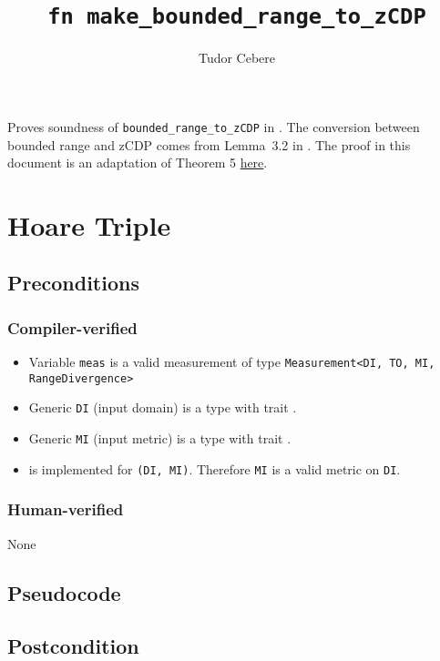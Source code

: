 \documentclass{article}
\title{\texttt{fn make\_bounded\_range\_to\_zCDP}}
\author{Tudor Cebere}
\begin{document}
\maketitle

\contrib
Proves soundness of \texttt{bounded\_range\_to\_zCDP} in .
The conversion between bounded range \cite{durfee2019practical} and zCDP comes from Lemma~3.2 in \cite{cesar2020unifying}.
The proof in this document is an adaptation of Theorem 5 \href{https://differentialprivacy.org/exponential-mechanism-bounded-range/}{here}.

\section{Hoare Triple}
\subsection*{Preconditions}
\subsubsection*{Compiler-verified}
\begin{itemize}
    \item Variable \texttt{meas} is a valid measurement of type \texttt{Measurement<DI, TO, MI, RangeDivergence>}
    \item Generic \texttt{DI} (input domain) is a type with trait . 
    \item Generic \texttt{MI} (input metric) is a type with trait .
    \item {} is implemented for \texttt{(DI, MI)}. Therefore \texttt{MI} is a valid metric on \texttt{DI}.
\end{itemize}

\subsubsection*{Human-verified}
None

\subsection*{Pseudocode}



\subsection*{Postcondition}
\end{document}
